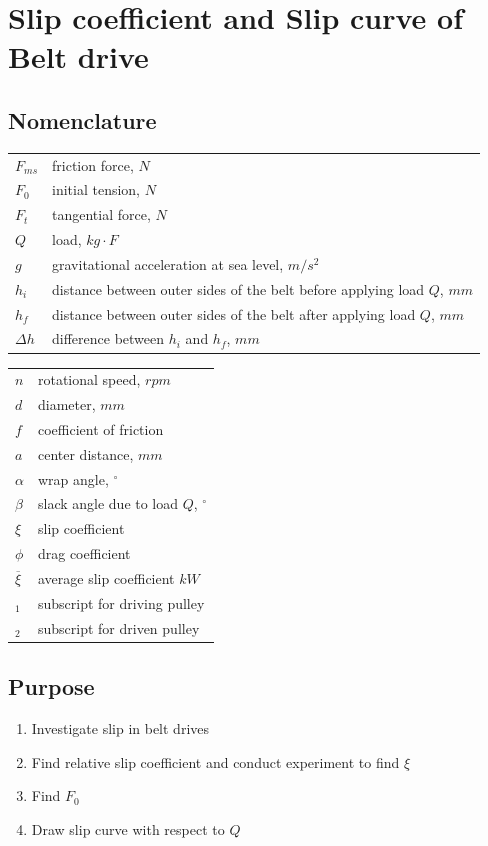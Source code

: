 \chapter{Slip coefficient and Slip curve of Belt drive}
\section{Nomenclature}
\begin{tabular}[t]{lp{7cm}}
	$ F_{ms} $ & friction force, $ N $\\
	$ F_0 $ & initial tension, $ N $\\
	$ F_t $ & tangential force, $ N $\\ 
	$ Q $ & load, $ kg\cdot F $\\
	$ g $ & gravitational acceleration at sea level, $ m/s^2 $\\
	$ h_i $ & distance between outer sides of the belt before applying load $ Q $, $ mm $\\
	$ h_f $ & distance between outer sides of the belt after applying load $ Q $, $ mm $\\
	$ \Delta h $ & difference between $ h_i $ and $ h_f $, $ mm $
\end{tabular}
\begin{tabular}[t]{lp{7cm}}
	$ n $ & rotational speed, $ rpm $\\
	$ d $ & diameter, $ mm $\\
	$ f $ & coefficient of friction\\
	$ a $ & center distance, $ mm $\\
	$ \alpha $ & wrap angle, $ ^{\circ} $\\
	$ \beta $ & slack angle due to load $ Q $, $ ^{\circ} $\\
	$ \xi $ & slip coefficient\\
	$ \phi $ & drag coefficient\\
	$ \overline{\xi} $ & average slip coefficient $ kW $\\
	$ _1 $ & subscript for driving pulley\\
	$ _2 $ & subscript for driven pulley\\
\end{tabular}\newpage
\section{Purpose}
\begin{enumerate}
	\item Investigate slip in belt drives
	\item Find relative slip coefficient and conduct experiment to find $ \xi $
	\item Find $ F_0 $
	\item Draw slip curve with respect to $ Q $
\end{enumerate}

